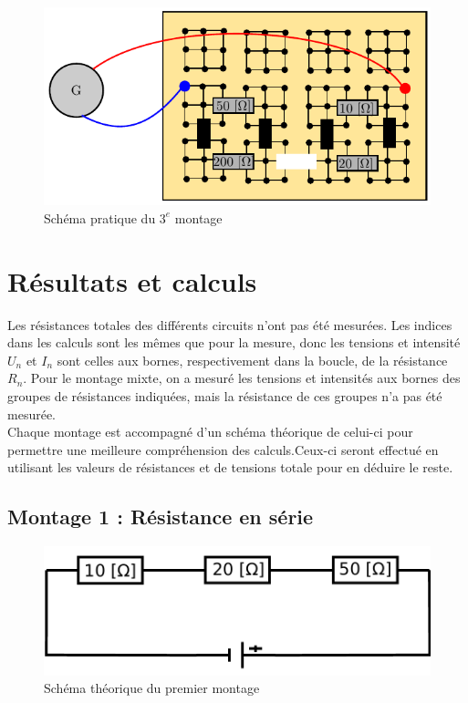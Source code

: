 \documentclass[11pt]{article}
\begin{document}
\begin{figure}[H]
\centering
\includegraphics[scale=1]{images/schm-pra/schm3.pdf}
\caption{Schéma pratique du $3^{e}$ montage}
\label{fig:pra-3}
\end{figure}

\section{Résultats et calculs}

Les résistances totales des différents circuits n'ont pas été mesurées. Les indices dans les calculs sont les mêmes que pour la mesure, donc les tensions et intensité $U_n$ et $I_n$ sont celles aux bornes, respectivement dans la boucle, de la résistance $R_n$. Pour le montage mixte, on a mesuré les tensions et intensités aux bornes des groupes de résistances indiquées, mais la résistance de ces groupes n'a pas été mesurée.\\
Chaque montage est accompagné d'un schéma théorique de celui-ci pour permettre une meilleure compréhension des calculs.Ceux-ci seront effectué en utilisant les valeurs de résistances et de tensions totale pour en déduire le reste.

\subsection{Montage 1 : Résistance en série}

\begin{figure}[H]
\centering
\includegraphics[scale=0.5]{images/elec-schem/montage1_1.pdf}
\caption{Schéma théorique du premier montage}
\label{fig:th-1}
\end{figure}
\end{document}

